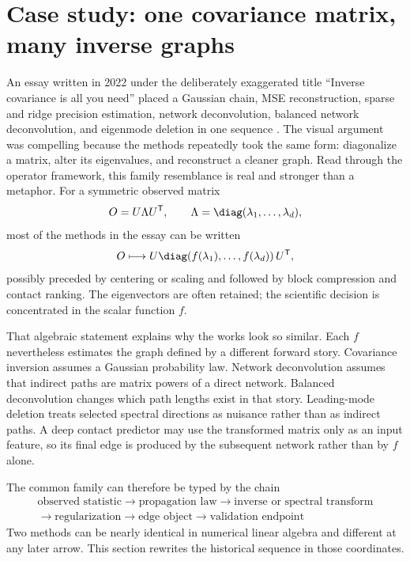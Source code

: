 \section[Case study: inverse graphs]{Case study: one covariance matrix, many inverse graphs}

An essay written in 2022 under the deliberately exaggerated title ``Inverse covariance is all
you need'' placed a Gaussian chain, MSE reconstruction, sparse and ridge precision estimation,
network deconvolution, balanced network deconvolution, and eigenmode deletion in one sequence
\cite{wang2022inverse}.  The visual argument was compelling because the methods repeatedly took
the same form: diagonalize a matrix, alter its eigenvalues, and reconstruct a cleaner graph.  Read
through the operator framework, this family resemblance is real and stronger than a metaphor.
For a symmetric observed matrix
\begin{equation}
O=U\Lambda U^{\mathsf T},
\qquad
\Lambda=\diag(\lambda_1,\ldots,\lambda_d),
\end{equation}
most of the methods in the essay can be written
\begin{equation}
O\longmapsto
U\diag\!\left(f(\lambda_1),\ldots,f(\lambda_d)\right)U^{\mathsf T},
\label{eq:inverse-covariance-spectral-family}
\end{equation}
possibly preceded by centering or scaling and followed by block compression and contact ranking.
The eigenvectors are often retained; the scientific decision is concentrated in the scalar
function $f$.

That algebraic statement explains why the works look so similar.  Each $f$ nevertheless estimates
the graph defined by a different forward story.  Covariance
inversion assumes a Gaussian probability law.  Network deconvolution assumes that indirect paths
are matrix powers of a direct network.  Balanced deconvolution changes which path lengths exist in
that story.  Leading-mode deletion treats selected spectral directions as nuisance rather than as
indirect paths.  A deep contact predictor may use the transformed matrix only as an input feature,
so its final edge is produced by the subsequent network rather than by $f$ alone.

The common family can therefore be typed by the chain
\begin{equation}
\boxed{
\begin{gathered}
\text{observed statistic}
\longrightarrow\text{propagation law}
\longrightarrow\text{inverse or spectral transform}\\
\longrightarrow\text{regularization}
\longrightarrow\text{edge object}
\longrightarrow\text{validation endpoint}
\end{gathered}}
\label{eq:inverse-graph-audit-chain}
\end{equation}
Two methods can be nearly identical in numerical linear algebra and different at any later arrow.
This section rewrites the historical sequence in those coordinates.

